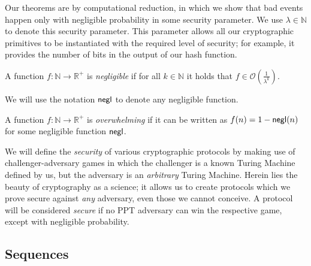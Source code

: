 Our theorems are by computational reduction, in which we show that bad
events happen only with negligible probability in some security parameter. We
use $\lambda \in \mathbb{N}$ to denote this security parameter. This parameter allows all our
cryptographic primitives to be instantiated with the required level of security;
for example, it provides the number of bits in the output of our hash function.

\begin{definition}[Negligible]
  A function $f: \mathbb{N} \longrightarrow \mathbb{R}^+$ is
  \emph{negligible} if for all $k \in \mathbb{N}$ it holds that
  $f \in \mathcal{O}(\frac{1}{\lambda^k})$.
\end{definition}

We will use the notation $\mathsf{negl}$ to denote any negligible function.

\begin{definition}[Overwhelming]
  A function $f: \mathbb{N} \longrightarrow \mathbb{R}^+$ is
  \emph{overwhelming} if it can be written as $f(n) = 1 - \mathsf{negl}(n)$ for
  some negligible function $\mathsf{negl}$.
\end{definition}

We will define the \emph{security} of various cryptographic protocols by making use of challenger-adversary games in which the challenger is a known Turing Machine defined by us, but the adversary is an \emph{arbitrary} Turing Machine. Herein lies the beauty of cryptography as a science; it allows us to create protocols which we prove secure against \emph{any} adversary, even those we cannot conceive. A protocol will be considered \emph{secure} if no PPT adversary can win the respective game, except with negligible probability.

\subsection{Sequences}

